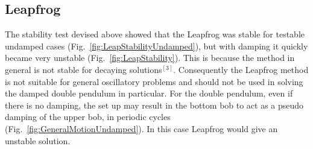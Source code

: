 \documentclass[10pt,a4paper]{article}
\begin{document}
\subsection{Leapfrog}
The stability test devised above showed that the Leapfrog was stable for testable undamped cases (Fig.~\ref{fig:LeapStabilityUndamped}), but with damping it quickly became very unstable (Fig.~\ref{fig:LeapStability}). This is because the method in general is not stable for decaying solutions$^{[3]}$. Consequently the Leapfrog method is not suitable for general oscillatory problems and should not be used in solving the damped double pendulum in particular. For the double pendulum, even if there is no damping, the set up may result in the bottom bob to act as a pseudo damping of the upper bob, in periodic cycles (Fig.~\ref{fig:GeneralMotionUndamped}). In this case Leapfrog would give an unstable solution.
\end{document}
